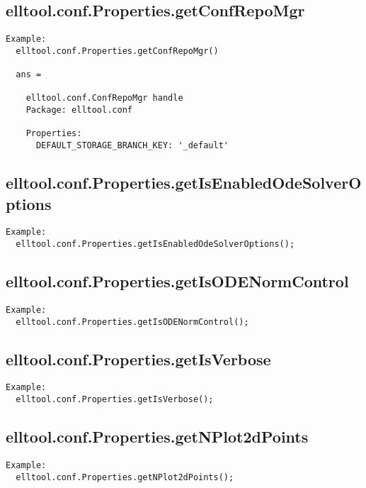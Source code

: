\subsection{\texorpdfstring{elltool.conf.Properties.getConfRepoMgr}{getConfRepoMgr}}\label{method:elltool.conf.Properties.getConfRepoMgr}
\begin{verbatim}
Example:
  elltool.conf.Properties.getConfRepoMgr()

  ans =

    elltool.conf.ConfRepoMgr handle
    Package: elltool.conf

    Properties:
      DEFAULT_STORAGE_BRANCH_KEY: '_default'
\end{verbatim}
\subsection{\texorpdfstring{elltool.conf.Properties.getIsEnabledOdeSolverOptions}{getIsEnabledOdeSolverOptions}}\label{method:elltool.conf.Properties.getIsEnabledOdeSolverOptions}
\begin{verbatim}
Example:
  elltool.conf.Properties.getIsEnabledOdeSolverOptions();
\end{verbatim}
\subsection{\texorpdfstring{elltool.conf.Properties.getIsODENormControl}{getIsODENormControl}}\label{method:elltool.conf.Properties.getIsODENormControl}
\begin{verbatim}
Example:
  elltool.conf.Properties.getIsODENormControl();
\end{verbatim}
\subsection{\texorpdfstring{elltool.conf.Properties.getIsVerbose}{getIsVerbose}}\label{method:elltool.conf.Properties.getIsVerbose}
\begin{verbatim}
Example:
  elltool.conf.Properties.getIsVerbose();
\end{verbatim}
\subsection{\texorpdfstring{elltool.conf.Properties.getNPlot2dPoints}{getNPlot2dPoints}}\label{method:elltool.conf.Properties.getNPlot2dPoints}
\begin{verbatim}
Example:
  elltool.conf.Properties.getNPlot2dPoints();
\end{verbatim}

